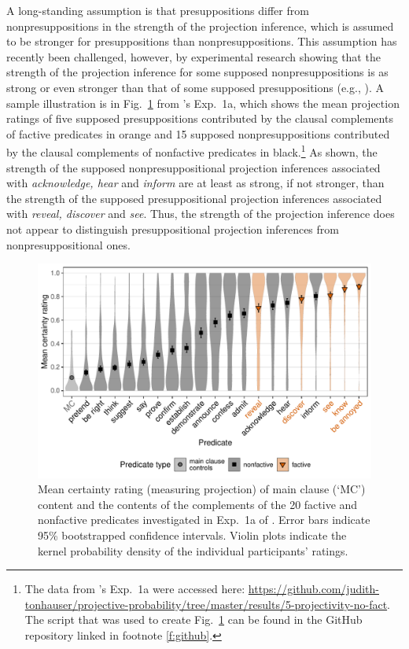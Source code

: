 \documentclass[11pt,fleqn]{article}
\newcommand{\6}{\mbox{$[\hspace*{-.6mm}[$}}
\newcommand{\9}{\mbox{$]\hspace*{-.6mm}]$}}
\newcommand{\citepos}[1]{\citeauthor{#1}'s \citeyear{#1}}
\begin{document}
A long-standing assumption is that presuppositions differ from nonpresuppositions in the strength of the projection inference, which is assumed to be stronger for presuppositions than nonpresuppositions. This assumption has recently been challenged, however, by experimental research showing that the strength of the projection inference for some supposed nonpresuppositions is as strong or even stronger than that of some supposed presuppositions (e.g., \citealt{demarneffe-etal-sub23,tbd-variability,degen-tonhauser-language}).  A sample illustration is in Fig.~\ref{fig:dt1a} from \citepos{degen-tonhauser-language} Exp.~1a, which shows the mean projection ratings of five supposed presuppositions contributed by the clausal complements of factive predicates in \color{orange}orange \color{black} and 15 supposed nonpresuppositions contributed by the clausal complements of nonfactive predicates in black.\footnote{The data from \citepos{degen-tonhauser-language} Exp.~1a were accessed here: \url{https://github.com/judith-tonhauser/projective-probability/tree/master/results/5-projectivity-no-fact}. The script that was used to create Fig.~\ref{fig:dt1a} can be found in the GitHub repository linked in footnote \ref{f:github}.} As shown, the strength of the supposed nonpresuppositional projection inferences associated with \emph{acknowledge, hear} and \emph{inform} are at least as strong, if not stronger, than the strength of the supposed presuppositional projection inferences associated with \emph{reveal, discover} and \emph{see}. Thus, the strength of the projection inference does not appear to distinguish presuppositional projection inferences from nonpresuppositional ones.

\begin{figure}[h!]
\centering
\includegraphics[width=.8\textwidth]{../../../results/main/graphs/mean-certainty-by-predicateType}
\caption{Mean certainty rating (measuring projection) of main clause (`MC') content and the contents of the complements of the 20 \color{orange}factive \color{black} and \color{black}nonfactive \color{black} predicates investigated in Exp.~1a of \citealt{degen-tonhauser-language}. Error bars indicate 95\% bootstrapped confidence intervals. Violin plots indicate the kernel probability density of the individual participants' ratings.}\label{fig:dt1a}
\end{figure}
\end{document}
